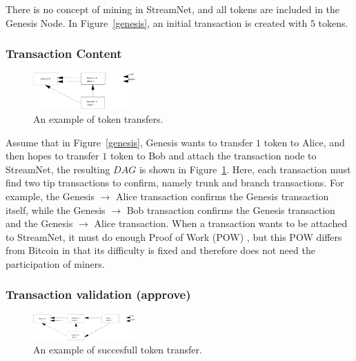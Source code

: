 There is no concept of mining in StreamNet, and all tokens are included in the Genesis Node.
In Figure~\ref{genesis}, an initial transaction is created with $5$ tokens.


\subsubsection{Transaction Content}

\begin{figure}[!ht]
\begin{center}
\includegraphics[width=0.35\textwidth]{figures/simple_transfer.eps}
    \caption{
        An example of token transfers.
     }
\label{simple_transfer}
\end{center}
\end{figure}

Assume that in Figure~\ref{genesis}, Genesis wants to transfer $1$ token to Alice, 
and then hopes to transfer $1$ token to Bob and attach the transaction node to StreamNet, the resulting $DAG$ is shown in Figure~\ref{simple_transfer}.
Here, each transaction must find two tip transactions to confirm, namely trunk and branch transactions.
For example, the Genesis $\rightarrow$ Alice transaction confirms the Genesis transaction itself,
while the Genesis $\rightarrow$ Bob transaction confirms the Genesis transaction and the Genesis $\rightarrow$ Alice transaction.
When a transaction wants to be attached to StreamNet, it must do enough Proof of Work (POW) \cite{pow_tangle},
but this POW differs from Bitcoin in that its difficulty is fixed and therefore does not need the participation of miners.

\subsubsection{Transaction validation (approve)}

\begin{figure}[!ht]
\begin{center}
\includegraphics[width=0.35\textwidth]{figures/txn_success.eps}
    \caption{
        An example of succesfull token transfer.
     }
\label{txn_success}
\end{center}
\end{figure}

